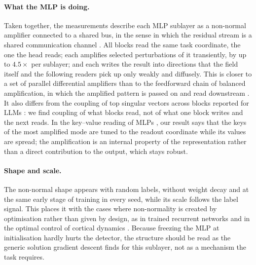 \documentclass[10pt]{article}
\begin{document}
\paragraph{What the MLP is doing.} Taken together, the measurements describe each MLP sublayer as a non-normal amplifier connected to a
shared bus, in the sense in which the residual stream is a shared communication channel \citep{elhage2021mathematical}. All blocks read the same task coordinate, the one the head reads; each amplifies selected perturbations of it transiently,
by up to $4.5\times$ per sublayer; and each writes the result into directions that the field itself and the following readers pick up only
weakly and diffusely. This is closer to a set of parallel differential amplifiers than to the feedforward chain of balanced amplification,
in which the amplified pattern is passed on and read downstream \citep{murphy2009balanced,goldman2009memory}. It also differs from the
coupling of top singular vectors across blocks reported for LLMs \citep{aubry2025transformer}: we find coupling of what blocks read, not of
what one block writes and the next reads. In the key--value reading of MLPs \citep{geva2021transformer}, our result says that the keys of
the most amplified mode are tuned to the readout coordinate while its values are spread; the amplification is an internal property of the
representation rather than a direct contribution to the output, which stays robust.

\paragraph{Shape and scale.} The non-normal shape appears with random labels, without weight decay and at the same early stage of training
in every seed, while its scale follows the label signal. This places it with the cases where non-normality is created by optimisation
rather than given by design, as in trained recurrent networks \citep{orhan2019improved} and in the optimal control of cortical dynamics
\citep{hennequin2014optimal}. Because freezing the MLP at initialisation hardly hurts the detector, the structure should be read as the
generic solution gradient descent finds for this sublayer, not as a mechanism the task requires.
\end{document}
